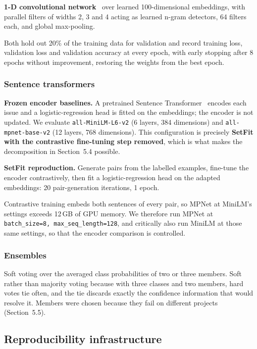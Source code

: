 \textbf{1-D convolutional network}~\cite{kim2014cnn} over learned 100-dimensional embeddings, with
parallel filters of widths 2, 3 and 4 acting as learned n-gram detectors, 64
filters each, and global max-pooling.
 
Both hold out 20\% of the training data for validation and record training loss,
validation loss and validation accuracy at every epoch, with early stopping after
8 epochs without improvement, restoring the weights from the best epoch.
 
\subsubsection{Sentence transformers}
\label{sec:sentence-transformers}
 
\textbf{Frozen encoder baselines.} A pretrained Sentence Transformer~\cite{reimers2019sbert} encodes each
issue and a logistic-regression head is fitted on the embeddings; the encoder is
not updated. We evaluate \texttt{all-MiniLM-L6-v2} (6 layers, 384 dimensions) and
\texttt{all-mpnet-base-v2} (12 layers, 768 dimensions). This configuration is
precisely \textbf{SetFit with the contrastive fine-tuning step removed}, which is
what makes the decomposition in Section~5.4 possible.
 
\textbf{SetFit reproduction.} Generate pairs from the labelled examples,
fine-tune the encoder contrastively, then fit a logistic-regression head on the
adapted embeddings: 20 pair-generation iterations, 1 epoch.
 
Contrastive training embeds both sentences of every pair, so MPNet at MiniLM's
settings exceeds 12\,GB of GPU memory. We therefore run MPNet at
\texttt{batch\_size=8, max\_seq\_length=128}, and critically also run
MiniLM at those same settings, so that the encoder comparison is controlled.
 
\subsubsection{Ensembles}
\label{sec:ensembles}
 
Soft voting over the averaged class probabilities of two or three members. Soft
rather than majority voting because with three classes and two members, hard
votes tie often, and the tie discards exactly the confidence information that
would resolve it. Members were chosen because they fail on different projects
(Section~5.5).
 
\subsection{Reproducibility infrastructure}
\label{sec:reproducibility}
 
